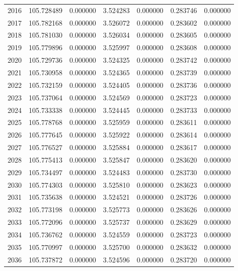\begin{tabular}{rrrrrrr}
2016 & 105.728489 &    0.000000 &  3.524283 &   0.000000 &   0.283746 &  0.000000 \\
2017 & 105.782168 &    0.000000 &  3.526072 &   0.000000 &   0.283602 &  0.000000 \\
2018 & 105.781030 &    0.000000 &  3.526034 &   0.000000 &   0.283605 &  0.000000 \\
2019 & 105.779896 &    0.000000 &  3.525997 &   0.000000 &   0.283608 &  0.000000 \\
2020 & 105.729736 &    0.000000 &  3.524325 &   0.000000 &   0.283742 &  0.000000 \\
2021 & 105.730958 &    0.000000 &  3.524365 &   0.000000 &   0.283739 &  0.000000 \\
2022 & 105.732159 &    0.000000 &  3.524405 &   0.000000 &   0.283736 &  0.000000 \\
2023 & 105.737064 &    0.000000 &  3.524569 &   0.000000 &   0.283723 &  0.000000 \\
2024 & 105.733338 &    0.000000 &  3.524445 &   0.000000 &   0.283733 &  0.000000 \\
2025 & 105.778768 &    0.000000 &  3.525959 &   0.000000 &   0.283611 &  0.000000 \\
2026 & 105.777645 &    0.000000 &  3.525922 &   0.000000 &   0.283614 &  0.000000 \\
2027 & 105.776527 &    0.000000 &  3.525884 &   0.000000 &   0.283617 &  0.000000 \\
2028 & 105.775413 &    0.000000 &  3.525847 &   0.000000 &   0.283620 &  0.000000 \\
2029 & 105.734497 &    0.000000 &  3.524483 &   0.000000 &   0.283730 &  0.000000 \\
2030 & 105.774303 &    0.000000 &  3.525810 &   0.000000 &   0.283623 &  0.000000 \\
2031 & 105.735638 &    0.000000 &  3.524521 &   0.000000 &   0.283726 &  0.000000 \\
2032 & 105.773198 &    0.000000 &  3.525773 &   0.000000 &   0.283626 &  0.000000 \\
2033 & 105.772096 &    0.000000 &  3.525737 &   0.000000 &   0.283629 &  0.000000 \\
2034 & 105.736762 &    0.000000 &  3.524559 &   0.000000 &   0.283723 &  0.000000 \\
2035 & 105.770997 &    0.000000 &  3.525700 &   0.000000 &   0.283632 &  0.000000 \\
2036 & 105.737872 &    0.000000 &  3.524596 &   0.000000 &   0.283720 &  0.000000 \\

\end{tabular}
